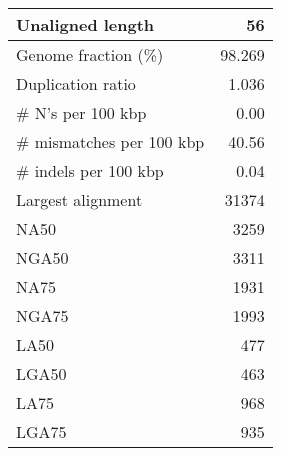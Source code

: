 \documentclass[12pt,a4paper]{article}
\begin{document}
\begin{table}[ht]
\begin{center}
\begin{tabular}{|l*{1}{|r}|}
Unaligned length & 56 \\ \hline
Genome fraction (\%) & 98.269 \\ \hline
Duplication ratio & 1.036 \\ \hline
\# N's per 100 kbp & 0.00 \\ \hline
\# mismatches per 100 kbp & 40.56 \\ \hline
\# indels per 100 kbp & 0.04 \\ \hline
Largest alignment & 31374 \\ \hline
NA50 & 3259 \\ \hline
NGA50 & 3311 \\ \hline
NA75 & 1931 \\ \hline
NGA75 & 1993 \\ \hline
LA50 & 477 \\ \hline
LGA50 & 463 \\ \hline
LA75 & 968 \\ \hline
LGA75 & 935 \\ \hline
\end{tabular}
\end{center}
\end{table}
\end{document}
